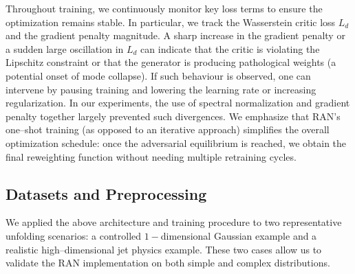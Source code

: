 {{        Throughout training, we continuously monitor key loss terms to ensure the optimization remains stable.
        In particular, we track the Wasserstein critic loss $L_d$ and the gradient penalty magnitude.
        A sharp increase in the gradient penalty or a sudden large oscillation in $L_d$ can indicate that the critic is violating the Lipschitz constraint or that the generator is producing pathological weights (a potential onset of mode collapse).
        If such behaviour is observed, one can intervene by pausing training and lowering the learning rate or increasing regularization.
        In our experiments, the use of spectral normalization and gradient penalty together largely prevented such divergences.
        We emphasize that RAN’s one--shot training (as opposed to an iterative approach) simplifies the overall optimization schedule: once the adversarial equilibrium is reached, we obtain the final reweighting function without needing multiple retraining cycles.
    
    \subsection{Datasets and Preprocessing}
        We applied the above architecture and training procedure to two representative unfolding scenarios: a controlled \(1-\)dimensional Gaussian example and a realistic high--dimensional jet physics example.
        These two cases allow us to validate the RAN implementation on both simple and complex distributions.

}}
